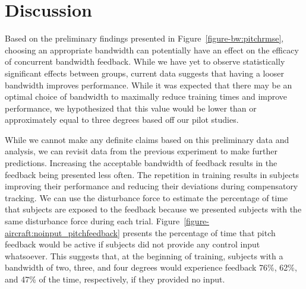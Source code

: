 \section{Discussion}

Based on the preliminary findings presented in Figure~\ref{figure-bw:pitchrmse}, choosing an appropriate bandwidth can potentially have an effect on the efficacy of concurrent bandwidth feedback.
While we have yet to observe statistically significant effects between groups, current data suggests that having a looser bandwidth improves performance.
While it was expected that there may be an optimal choice of bandwidth to maximally reduce training times and improve performance, we hypothesized that this value would be lower than or approximately equal to three degrees based off our pilot studies.

While we cannot make any definite claims based on this preliminary data and analysis, we can revisit data from the previous experiment to make further predictions.
Increasing the acceptable bandwidth of feedback results in the feedback being presented less often.
The repetition in training results in subjects improving their performance and reducing their deviations during compensatory tracking.
We can use the disturbance force to estimate the percentage of time that subjects are exposed to the feedback because we presented subjects with the same disturbance force during each trial.
Figure~\ref{figure-aircraft:noinput_pitchfeedback} presents the percentage of time that pitch feedback would be active if subjects did not provide any control input whatsoever.
This suggests that, at the beginning of training, subjects with a bandwidth of two, three, and four degrees would experience feedback 76\%, 62\%, and 47\% of the time, respectively, if they provided no input.

